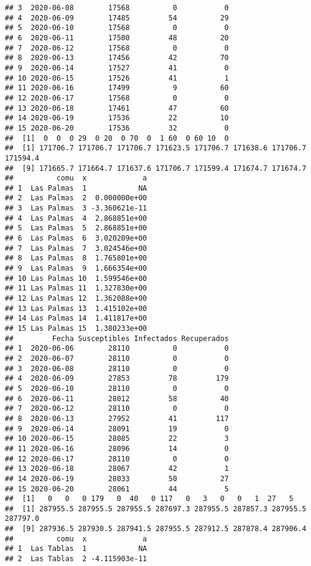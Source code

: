\documentclass[
]{article}
\begin{document}
\begin{verbatim}
## 3  2020-06-08        17568          0           0
## 4  2020-06-09        17485         54          29
## 5  2020-06-10        17568          0           0
## 6  2020-06-11        17500         48          20
## 7  2020-06-12        17568          0           0
## 8  2020-06-13        17456         42          70
## 9  2020-06-14        17527         41           0
## 10 2020-06-15        17526         41           1
## 11 2020-06-16        17499          9          60
## 12 2020-06-17        17568          0           0
## 13 2020-06-18        17461         47          60
## 14 2020-06-19        17536         22          10
## 15 2020-06-20        17536         32           0
##  [1]  0  0  0 29  0 20  0 70  0  1 60  0 60 10  0
##  [1] 171706.7 171706.7 171706.7 171623.5 171706.7 171638.6 171706.7 171594.4
##  [9] 171665.7 171664.7 171637.6 171706.7 171599.4 171674.7 171674.7
##          comu  x             a
## 1  Las Palmas  1            NA
## 2  Las Palmas  2  0.000000e+00
## 3  Las Palmas  3 -3.360621e-11
## 4  Las Palmas  4  2.868851e+00
## 5  Las Palmas  5  2.868851e+00
## 6  Las Palmas  6  3.020209e+00
## 7  Las Palmas  7  3.024546e+00
## 8  Las Palmas  8  1.765801e+00
## 9  Las Palmas  9  1.666354e+00
## 10 Las Palmas 10  1.599546e+00
## 11 Las Palmas 11  1.327830e+00
## 12 Las Palmas 12  1.362088e+00
## 13 Las Palmas 13  1.415102e+00
## 14 Las Palmas 14  1.411817e+00
## 15 Las Palmas 15  1.380233e+00
##         Fecha Susceptibles Infectados Recuperados
## 1  2020-06-06        28110          0           0
## 2  2020-06-07        28110          0           0
## 3  2020-06-08        28110          0           0
## 4  2020-06-09        27853         78         179
## 5  2020-06-10        28110          0           0
## 6  2020-06-11        28012         58          40
## 7  2020-06-12        28110          0           0
## 8  2020-06-13        27952         41         117
## 9  2020-06-14        28091         19           0
## 10 2020-06-15        28085         22           3
## 11 2020-06-16        28096         14           0
## 12 2020-06-17        28110          0           0
## 13 2020-06-18        28067         42           1
## 14 2020-06-19        28033         50          27
## 15 2020-06-20        28061         44           5
##  [1]   0   0   0 179   0  40   0 117   0   3   0   0   1  27   5
##  [1] 287955.5 287955.5 287955.5 287697.3 287955.5 287857.3 287955.5 287797.0
##  [9] 287936.5 287930.5 287941.5 287955.5 287912.5 287878.4 287906.4
##          comu  x             a
## 1  Las Tablas  1            NA
## 2  Las Tablas  2 -4.115903e-11

\end{verbatim}
\end{document}
